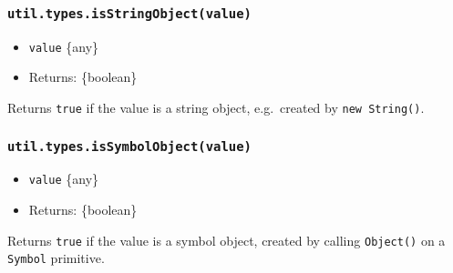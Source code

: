 \subsubsection{\texorpdfstring{\texttt{util.types.isStringObject(value)}}{util.types.isStringObject(value)}}\label{util.types.isstringobjectvalue}

\begin{itemize}
\tightlist
\item
  \texttt{value} \{any\}
\item
  Returns: \{boolean\}
\end{itemize}

Returns \texttt{true} if the value is a string object, e.g.~created by
\texttt{new\ String()}.

\begin{Shaded}
\begin{Highlighting}[]
\NormalTok{(}\NormalTok{)}\OperatorTok{;}  
\NormalTok{(} \NormalTok{(}\NormalTok{))}\OperatorTok{;}   
\end{Highlighting}
\end{Shaded}

\subsubsection{\texorpdfstring{\texttt{util.types.isSymbolObject(value)}}{util.types.isSymbolObject(value)}}\label{util.types.issymbolobjectvalue}

\begin{itemize}
\tightlist
\item
  \texttt{value} \{any\}
\item
  Returns: \{boolean\}
\end{itemize}

Returns \texttt{true} if the value is a symbol object, created by
calling \texttt{Object()} on a \texttt{Symbol} primitive.

\begin{Shaded}
\begin{Highlighting}[]
\OperatorTok{=} \NormalTok{(}\NormalTok{)}\OperatorTok{;}
\OperatorTok{;}  
\NormalTok{(}\OperatorTok{;}   
\end{Highlighting}
\end{Shaded}

